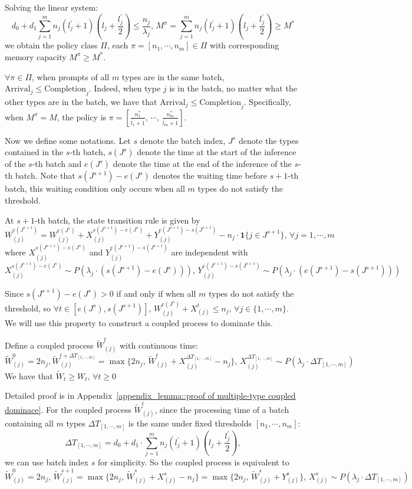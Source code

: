 Solving the linear system:
$$d_0+d_1\sum_{j=1}^mn_j(l_j^\prime+1)\left(l_j+\frac{l_j^\prime}{2}\right)\leq \frac{n_j}{\lambda_j},\,M^{\pi} = \sum_{j=1}^mn_j(l_j^\prime+1)\left(l_j+\frac{l_j^\prime}{2}\right)\geq  M^{*}$$
we obtain the policy class $\Pi$, each $\pi = [n_1,\cdots,n_m]\in \Pi$ with corresponding memory capacity $M^{\pi} \geq  M^*$.

$\forall \pi \in \Pi$, when prompts of all $m$ types are in the same batch, $\text{Arrival}_j\leq \text{Completion}_j$. Indeed, when type $j$ is in the batch, no matter what the other types are in the batch, we have that $\text{Arrival}_j\leq \text{Completion}_j$. Specifically, when $M^\pi = M$, the policy is $\pi = [ \frac{n_1^*}{l_1^\prime+1},\,\cdots,\,\frac{n_m^*}{l_m^\prime+1} ]$. 

Now we define some notations. Let $s$ denote the batch index, $J^s$ denote the types contained in the $s$-th batch, $s(J^s)$ denote the time at the start of the inference of the $s$-th batch and $e(J^s)$ denote the time at the end of the inference of the $s$-th batch. Note that $s(J^{s+1})-e(J^s)$ denotes the waiting time before $s+1$-th batch, this waiting condition only occurs when all $m$ types do not satisfy the threshold.

At $s+1$-th batch, the state transition rule is given by
$$W_{(j)}^{e(J^{s+1})}=W_{(j)}^{e(J^s)}+X_{(j)}^{s(J^{s+1})-e(J^{s})}+Y_{(j)}^{e(J^{s+1})-s(J^{s+1})}- n_j\cdot \mathbf{1}\{j\in J^{s+1}\} ,\,\forall j  = 1,\cdots,m$$
where $X_{(j)}^{s(J^{s+1})-e(J^{s})}$ and $Y_{(j)}^{e(J^{s+1})-s(J^{s+1})}$ are independent with
$$X_{(j)}^{s(J^{s+1})-e(J^{s})} \sim P(\lambda_j \cdot (s(J^{s+1})-e(J^{s}))),\,Y_{(j)}^{e(J^{s+1})-s(J^{s+1})} \sim P(\lambda_j \cdot (e(J^{s+1})-s(J^{s+1})))$$

Since $s(J^{s+1})-e(J^{s})>0$ if and only if  when all $m$ types do not satisfy the threshold, so $\forall t \in [e(J^s), s(J^{s+1})]$, $W_{(j)}^{e(J^s)}+X^t_{(j)}\leq n_j,\, \forall j \in \{1,\cdots,m\}$. We will use this property to construct a coupled process to dominate this. 

\begin{lemma}\label{lemma::multiple-type coupled dominace}
Define a coupled process $\tilde{W}^t_{(j)}$ with continuous time:
$$\tilde{W}_{(j)}^0=2n_j, \tilde{W}_{(j)}^{t+\Delta T_{[1,\cdots,m]}}= \max\{ 2n_j,\, \tilde{W}_{(j)}^t +X_{(j)}^{\Delta T_{[1,\cdots,m]}}-n_j \},\, X^{\Delta T_{[1,\cdots,m]}}_{(j)} \sim P(\lambda_j\cdot \Delta T_{[1,\cdots,m]}) $$
We have that $\tilde{W}_t\geq W_t,\,\forall t\geq 0$
\end{lemma}
Detailed proof is in Appendix~\ref{appendix_lemma::proof of multiple-type coupled dominace}. For the coupled process $\tilde{W}^t_{(j)}$, since the processing time of a batch containing all $m$ types $\Delta T_{[1,\cdots,m]}$ is the same under fixed thresholds $[n_1,\cdots,n_m]$:
$$\Delta T_{[1,\cdots,m]} =  d_0 + d_1 \cdot \sum_{j=1}^m n_j(l_j^\prime+1)\left( l_j+\frac{l_j^\prime}{2} \right) ,$$
we can use batch index $s$ for simplicity. So the coupled process is equivalent to
$$\tilde{W}^0_{(j)} = 2n_j,\, \tilde{W}^{s+1}_{(j)} = \max\{ 2n_j, \, \tilde{W}^s_{(j)}+X^s_{(j)} - n_j \}=\max\{ 2n_j, \, \tilde{W}^s_{(j)}+Y^s_{(j)} \},\, X^s_{(j)} \sim P(\lambda_j \cdot \Delta T_{[1,\cdots,m]})  $$

